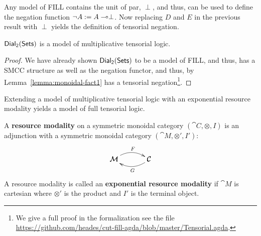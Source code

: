 Any model of FILL contains the unit of par, $\perp$, and thus, can be
used to define the negation function $\lnot A := A \multimap \perp$.  Now
replacing $D$ and $E$ in the previous result with $\perp$ yields the
definition of tensorial negation.
\begin{lemma}
  \label{lemma:dial-tensorial}
  $\mathsf{Dial_2}(\mathsf{Sets})$ is a model of multiplicative tensorial logic.
\end{lemma}
\begin{proof}
  We have already shown $\mathsf{Dial_2}(\mathsf{Sets})$ to be a model of FILL, and thus, has a
  SMCC structure as well as the negation functor, and thus, by
  Lemma~\ref{lemma:monoidal-fact1} has a tensorial
  negation\footnote{We give a full proof in the formalization see the
    file
    \url{https://github.com/heades/cut-fill-agda/blob/master/Tensorial.agda}.}.
\end{proof}

Extending a model of multiplicative tensorial logic with an exponential
resource modality yields a model of full tensorial logic.
\begin{definition}
  \label{def:resource-modality}
  A \textbf{resource modality} on a symmetric monoidal category
  $(\cat{C}, \otimes, I)$ is an adjunction with a symmetric monoidal
  category $(\cat{M}, \otimes', I')$:
  \[
  \bfig
  \morphism(0,0)|a|/{@{>}@/^1em/}/<500,0>[\cat{M}`\cat{C};F]
  \morphism(0,0)|b|/{@{<-}@/_1em/}/<500,0>[\cat{M}`\cat{C};G]
  \efig
  \]
  A resource modality is called an \textbf{exponential resource
    modality} if $\cat{M}$ is cartesian where $\otimes'$ is the
  product and $I'$ is the terminal object.
\end{definition}

